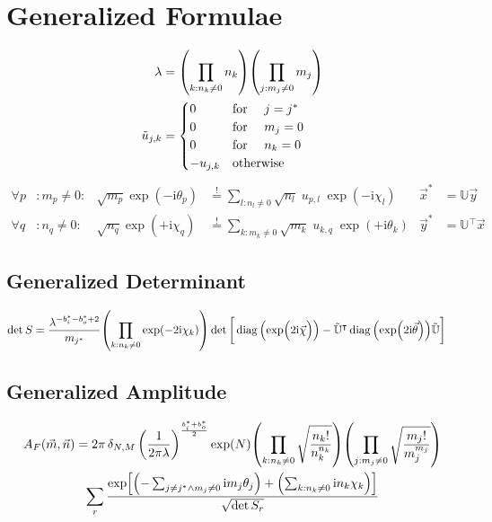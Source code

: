 \documentclass[
	english,
	a4paper,
	fontsize=10pt,
	parskip=half,
	titlepage=true,
	DIV=12,
	final
]{scrreprt}
\newcommand*{\transp}{\ensuremath{^\intercal}}
\newcommand*{\iunit}{\ensuremath{\mathrm{i}}}
\newcommand*{\equalCond}{  \mathop{=}\limits^!  }
\DeclareMathOperator{\diag}{diag}
\begin{document}
\section{Generalized Formulae}
\begin{align}
	\lambda
&=
	\qty( \prod_{k : n_k \neq 0} n_k )
	\qty( \prod_{j : m_j \neq 0} m_j )
\label{eqn:DefLambda_generic}
\\
	\tilde{u}_{j,k} 
&=
	\begin{cases}
		0			&\qq*{for } j = j^* \\
		0			&\qq*{for } m_j = 0 \\
		0			&\qq*{for } n_k = 0 \\
		-u_{j,k}		&\qotherwise*
	\end{cases}
\label{eqn:DefReducedDFT_generic}
\end{align}
\begin{align}
	\forall p &: m_p \neq 0 :
&
	\sqrt{m_p} \exp(-\iunit \theta_p)
&\equalCond
	\sum_{l : n_l \neq 0} \sqrt{n_l} \; u_{p,l} \; \exp(-\iunit\chi_l)
&
	\vec{x}^{*} &= \mathbb{U} \vec{y}
\label{eqn:FourierLinkForward_generic}
\\
	\forall q &: n_q \neq 0 :
&
	\sqrt{n_q} \exp(+\iunit \chi_q)
&\equalCond
	\sum_{k : m_k \neq 0}
	\sqrt{m_k} \; u_{k,q} \; \exp(+\iunit\theta_k)
&
	\vec{y}^{*} &= \mathbb{U}\transp \vec{x}
\label{eqn:FourierLinkBackward_generic}
\end{align}

\subsection{Generalized Determinant}
\begin{align}
	\det S
&=
	\frac{ \lambda^{-b_i^* - b_o^* + 2} }{ m_{j^*} }
	\qty( \prod_{k: n_k \neq 0} \exp(-2\iunit \chi_k) )
	\det\qty[\bigg.
		\diag\qty(\exp(\Big.2\iunit\vec{\chi}))
		-
		\tilde{\mathbb{U}}\transp
		\diag\qty(\exp(2\iunit\vec{\theta}))
		\tilde{\mathbb{U}}
	]
\label{eqn:detS_generic}
\end{align}

\subsection{Generalized Amplitude}
\begin{multline}
	A_F(\vec{m}, \vec{n})
=
	2\pi \, \delta_{N,M} \, \qty(
		\frac{1}{2\pi\lambda}
	)^{\frac{b_i^* + b_o^*}{2}}
	\exp(N)
	\qty( \prod_{k : n_k \neq 0}
		\sqrt{\frac
			{ n_k! }
			{ n_k^{n_k} }
	})
	\qty( \prod_{j : m_j \neq 0}
		\sqrt{\frac
			{ m_j! }
			{ m_j^{m_j} }
	})
\\
	\sum_r
		\frac
		{\exp[
			\qty(- \sum_{j\neq j^* \land m_j \neq 0} \iunit m_j \theta_j) + 
			\qty(  \sum_{k : n_k \neq 0}             \iunit n_k \chi  _k)
		]}
		{\sqrt{\det S_r}}
\label{eqn:Amp_generic}
\end{multline}
\end{document}
